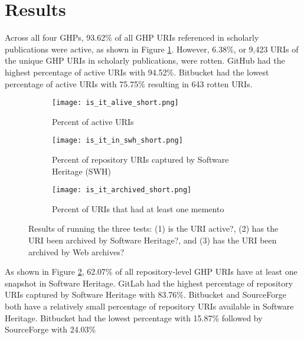 \section{Results}
Across all four GHPs, 93.62\% of all GHP URIs referenced in scholarly publications were active, as shown in Figure \ref{fig:alive}. However, 6.38\%, or 9,423 URIs of the unique GHP URIs in scholarly publications, were rotten. GitHub had the highest percentage of active URIs with 94.52\%. Bitbucket had the lowest percentage of active URIs with 75.75\% resulting in 643 rotten URIs. 

\begin{figure}
\centering
\begin{subfigure}{0.8\textwidth}
    \texttt{[image: is\_it\_alive\_short.png]}
    \caption{Percent of active URIs}
    \label{fig:alive}
\end{subfigure}
\begin{subfigure}{0.8\textwidth}
    \texttt{[image: is\_it\_in\_swh\_short.png]}
    \caption{Percent of repository URIs captured by Software Heritage (SWH)}
    \label{fig:swh}
\end{subfigure}
\begin{subfigure}{0.8\textwidth}
    \texttt{[image: is\_it\_archived\_short.png]}
    \caption{Percent of URIs that had at least one memento}
    \label{fig:timemap}
\end{subfigure}
\caption{Results of running the three tests: (1) is the URI active?, (2) has the URI been archived by Software Heritage?, and (3) has the URI been archived by Web archives?}
\label{fig:is_it}
\end{figure}

As shown in Figure \ref{fig:swh}, 62.07\% of all repository-level GHP URIs have at least one snapshot in Software Heritage. GitLab had the highest percentage of repository URIs captured by Software Heritage with 83.76\%. Bitbucket and SourceForge both have a relatively small percentage of repository URIs available in Software Heritage. Bitbucket had the lowest percentage with 15.87\% followed by SourceForge with 24.03\%

